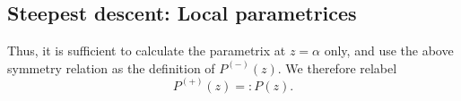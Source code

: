 \documentclass[usenames,dvipsnames]{article}
\theoremstyle{definition}
\numberwithin{equation}{section}
\numberwithin{figure}{section}
\begin{document}
\subsection{Steepest descent: Local parametrices}


Thus, it is sufficient to calculate the parametrix at $z=\alpha$ only, and use the above symmetry relation as the definition of $P^{(-)}(z)$. We therefore 
relabel 
    \begin{equation}
        P^{(+)}(z) =: P(z).
    \end{equation}
\end{document}
